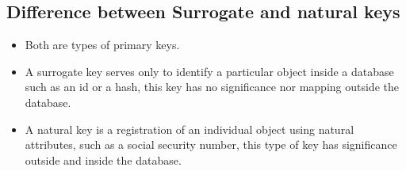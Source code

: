 \subsection{Difference between Surrogate and natural keys}
\begin{itemize}
    \item Both are types of primary keys.
    \item A surrogate key serves only to identify a particular object inside a database such as an id or a hash, this key has no significance nor mapping outside the database.
    \item A natural key is a registration of an individual object using natural attributes, such as a social security number, this type of key has significance outside and inside the database.
\end{itemize}



